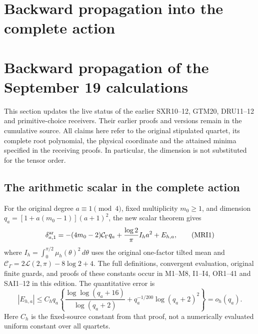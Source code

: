 \clearpage
\begingroup


\setcounter{equation}{0}
\renewcommand{\theequation}{MRI.\arabic{equation}}
\section*{Backward propagation into the complete action}
\section{Backward propagation of the September 19 calculations}
\label{mri:sec:multi-intake-receiver}

This section updates the live status of the earlier SXR10--12, GTM20,
DRU11--12 and primitive-choice receivers. Their earlier proofs and
versions remain in the cumulative source. All claims here refer to the
original stipulated quartet, its complete root polynomial, the physical
coordinate and the attained minima specified in the receiving proofs.
In particular, the dimension is not substituted for the tensor order.

\subsection{The arithmetic scalar in the complete action}
For the original degree $a\equiv1\pmod4$, fixed multiplicity $m_0\ge1$,
and dimension $q_a=[1+a(m_0-1)](a+1)^2$, the new scalar theorem gives
\[
 \delta_{a,1}^{\rm ar}
 =-(4m_0-2)\mathcal C_\Gamma q_a
       +\frac{\log2}{\pi}I_h a^2+E_{h,a},
 \tag{MRI1}
\]
where $I_h=\int_0^{\pi/2}\mu_h(\theta)^2\,d\theta$ uses the original
one-factor tilted mean and
$\mathcal C_\Gamma=2\mathcal L(2,\pi)-8\log2+4$.
The full definitions, convergent evaluation, original finite guards,
and proofs of these constants occur in M1--M8, I1--I4, OR1--41 and
SAI1--12 in this edition. The quantitative error is
\[
 |E_{h,a}|\le C_hq_a
 \left\{\frac{\log\log(q_a+16)}{\log(q_a+2)}
       +q_a^{-1/200}\log(q_a+2)^2\right\}=o_h(q_a).
 \tag{MRI2}
\]
Here $C_h$ is the fixed-source constant from that proof, not a
numerically evaluated uniform constant over all quartets.

